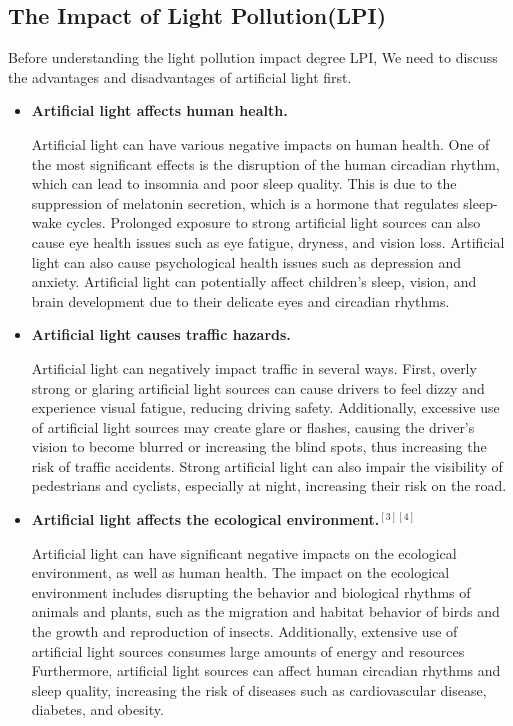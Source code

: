 \documentclass[12pt]{article}
\begin{document}
\subsection{The Impact of Light Pollution(LPI)}
Before understanding the light pollution impact degree LPI, We need to discuss the advantages and disadvantages of artificial light first.

\begin{itemize}

    \item \textbf{Artificial light affects human health.}

Artificial light can have various negative impacts on human health. One of the most significant effects is the disruption of the human circadian rhythm, which can lead to insomnia and poor sleep quality. This is due to the suppression of melatonin secretion, which is a hormone that regulates sleep-wake cycles. Prolonged exposure to strong artificial light sources can also cause eye health issues such as eye fatigue, dryness, and vision loss.  Artificial light can also cause psychological health issues such as depression and anxiety. Artificial light can potentially affect children's sleep, vision, and brain development due to their delicate eyes and circadian rhythms.


\item\textbf{Artificial light causes traffic hazards.}

Artificial light can negatively impact traffic in several ways. First, overly strong or glaring artificial light sources can cause drivers to feel dizzy and experience visual fatigue, reducing driving safety. Additionally, excessive use of artificial light sources may create glare or flashes, causing the driver's vision to become blurred or increasing the blind spots, thus increasing the risk of traffic accidents. Strong artificial light can also impair the visibility of pedestrians and cyclists, especially at night, increasing their risk on the road.


\item\textbf{Artificial light affects the ecological environment.}$^{[3][4]}$

Artificial light can have significant negative impacts on the ecological environment, as well as human health. The impact on the ecological environment includes disrupting the behavior and biological rhythms of animals and plants, such as the migration and habitat behavior of birds and the growth and reproduction of insects. Additionally, extensive use of artificial light sources consumes large amounts of energy and resources 
Furthermore, artificial light sources can affect human circadian rhythms and sleep quality, increasing the risk of diseases such as cardiovascular disease, diabetes, and obesity. 


\end{itemize}
\end{document}
